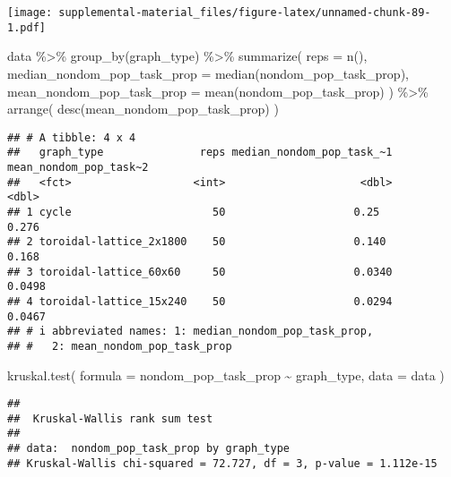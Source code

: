 \documentclass[
]{book}
\newenvironment{Shaded}{\begin{snugshade}}{\end{snugshade}}
\newcommand{\AttributeTok}[1]{\textcolor[rgb]{0.77,0.63,0.00}{#1}}
\newcommand{\FunctionTok}[1]{\textcolor[rgb]{0.00,0.00,0.00}{#1}}
\newcommand{\NormalTok}[1]{#1}
\newcommand{\SpecialCharTok}[1]{\textcolor[rgb]{0.00,0.00,0.00}{#1}}
\begin{document}
\texttt{[image: supplemental-material\_files/figure-latex/unnamed-chunk-89-1.pdf]}

\begin{Shaded}
\begin{Highlighting}[]
\NormalTok{data }\SpecialCharTok{\%\textgreater{}\%}
  \FunctionTok{group\_by}\NormalTok{(graph\_type) }\SpecialCharTok{\%\textgreater{}\%}
  \FunctionTok{summarize}\NormalTok{(}
    \AttributeTok{reps =} \FunctionTok{n}\NormalTok{(),}
    \AttributeTok{median\_nondom\_pop\_task\_prop =} \FunctionTok{median}\NormalTok{(nondom\_pop\_task\_prop),}
    \AttributeTok{mean\_nondom\_pop\_task\_prop =} \FunctionTok{mean}\NormalTok{(nondom\_pop\_task\_prop)}
\NormalTok{  ) }\SpecialCharTok{\%\textgreater{}\%}
  \FunctionTok{arrange}\NormalTok{(}
    \FunctionTok{desc}\NormalTok{(mean\_nondom\_pop\_task\_prop)}
\NormalTok{  )}
\end{Highlighting}
\end{Shaded}

\begin{verbatim}
## # A tibble: 4 x 4
##   graph_type               reps median_nondom_pop_task_~1 mean_nondom_pop_task~2
##   <fct>                   <int>                     <dbl>                  <dbl>
## 1 cycle                      50                    0.25                   0.276 
## 2 toroidal-lattice_2x1800    50                    0.140                  0.168 
## 3 toroidal-lattice_60x60     50                    0.0340                 0.0498
## 4 toroidal-lattice_15x240    50                    0.0294                 0.0467
## # i abbreviated names: 1: median_nondom_pop_task_prop,
## #   2: mean_nondom_pop_task_prop
\end{verbatim}

\begin{Shaded}
\begin{Highlighting}[]
\FunctionTok{kruskal.test}\NormalTok{(}
  \AttributeTok{formula =}\NormalTok{ nondom\_pop\_task\_prop }\SpecialCharTok{\textasciitilde{}}\NormalTok{ graph\_type,}
  \AttributeTok{data =}\NormalTok{ data}
\NormalTok{)}
\end{Highlighting}
\end{Shaded}

\begin{verbatim}
## 
##  Kruskal-Wallis rank sum test
## 
## data:  nondom_pop_task_prop by graph_type
## Kruskal-Wallis chi-squared = 72.727, df = 3, p-value = 1.112e-15
\end{verbatim}
\end{document}
